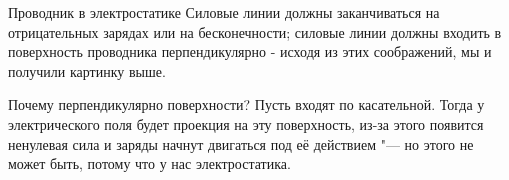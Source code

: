 \begin{section}{Проводник в электростатике}
	Силовые линии должны заканчиваться на отрицательных зарядах или на бесконечности; силовые линии должны входить 
	в поверхность проводника перпендикулярно - исходя из этих соображений, мы и получили картинку выше. 
	
	Почему перпендикулярно поверхности? Пусть входят по касательной. Тогда у электрического поля будет проекция на эту поверхность, из-за
	 этого появится ненулевая сила и заряды начнут двигаться под её действием "--- но этого не может быть, потому что у нас электростатика.

\end{section}
